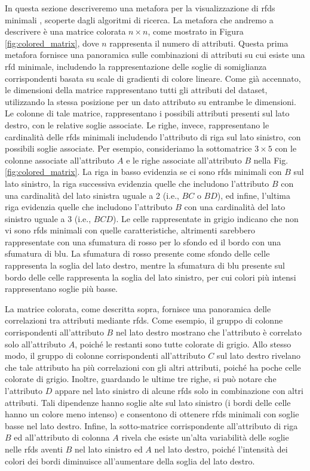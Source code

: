 In questa sezione descriveremo una metafora per la visualizzazione di \acrshort{rfds} minimali \cite{mdvisualization}, scoperte dagli algoritmi di ricerca. La metafora che andremo a descrivere \`{e} una matrice colorata $n\times n$, come mostrato in Figura \ref{fig:colored_matrix}, dove $n$ rappresenta il numero di attributi. Questa prima metafora fornisce una panoramica sulle combinazioni di attributi su cui esiste una \acrshort{rfd} minimale, includendo la rappresentazione delle soglie di somiglianza corrispondenti basata su scale di gradienti di colore lineare. Come gi\`{a} accennato, le dimensioni della matrice rappresentano tutti gli attributi del dataset, utilizzando la stessa posizione per un dato attributo su entrambe le dimensioni. Le colonne di tale matrice, rappresentano i possibili attributi presenti sul lato destro, con le relative soglie associate. Le righe, invece, rappresentano le cardinalit\`{a} delle \acrshort{rfds} minimali includendo l'attributo di riga sul lato sinistro, con possibili soglie associate. Per esempio, consideriamo la sottomatrice $3\times5$ con le colonne associate all'attributo $A$ e le righe associate all'attributo $B$ nella Fig. \ref{fig:colored_matrix}. La riga in basso evidenzia se ci sono \acrshort{rfds} minimali con $B$ sul lato sinistro, la riga successiva evidenzia quelle che includono l'attributo $B$ con una cardinalit\`{a} del lato sinistra uguale a 2 (i.e., $BC$ o $BD$), ed infine, l'ultima riga evidenzia quelle che includono l'attributo $B$ con una cardinalit\`{a} del lato sinistro uguale a 3 (i.e., $BCD$). Le celle rappresentate in grigio indicano che non vi sono \acrshort{rfds} minimali con quelle caratteristiche, altrimenti sarebbero rappresentate con una sfumatura di rosso per lo sfondo ed il bordo con una sfumatura di blu. La sfumatura di rosso presente come sfondo delle celle rappresenta la soglia del lato destro, mentre la sfumatura di blu presente sul bordo delle celle rappresenta la soglia del lato sinistro, per cui colori pi\`{u} intensi rappresentano soglie pi\`{u} basse.\par
La matrice colorata, come descritta sopra, fornisce una panoramica delle correlazioni tra attributi mediante \acrlong{rfds}. Come esempio, il gruppo di colonne corrispondenti all'attributo $B$ nel lato destro mostrano che l'attributo \`{e} correlato solo all'attributo $A$, poich\'{e} le restanti sono tutte colorate di grigio. Allo stesso modo, il gruppo di colonne corrispondenti all'attributo $C$ sul lato destro rivelano che tale attributo ha pi\`{u} correlazioni con gli altri attributi, poich\'{e} ha poche celle colorate di grigio. Inoltre, guardando le ultime tre righe, si pu\`{o} notare che l'attributo $D$ appare nel lato sinistro di alcune \acrlong{rfds} solo in combinazione con altri attributi. Tali dipendenze hanno soglie alte sul lato sinistro (i bordi delle celle hanno un colore meno intenso) e consentono di ottenere \acrlong{rfds} minimali con soglie basse nel lato destro. Infine, la sotto-matrice corrispondente all'attributo di riga $B$ ed all'attributo di colonna $A$ rivela che esiste un'alta variabilit\`{a} delle soglie nelle \acrlong{rfds} aventi $B$ nel lato sinistro ed $A$ nel lato destro, poich\'{e} l'intensit\`{a} dei colori dei bordi diminuisce all'aumentare della soglia del lato destro.